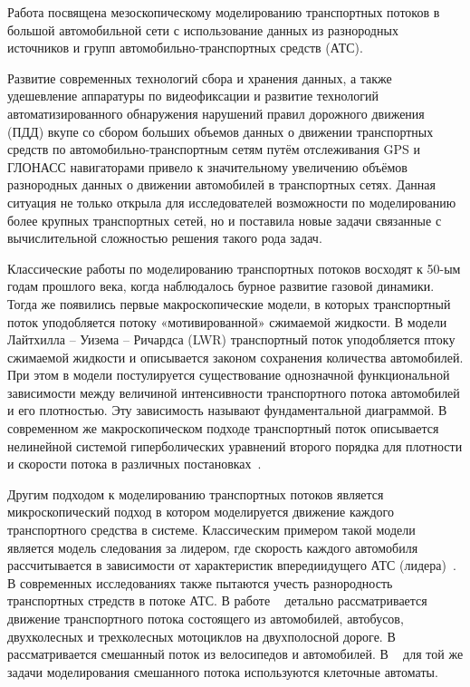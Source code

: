 
Работа посвящена мезоскопическому моделированию транспортных потоков в большой 
автомобильной сети с использование данных из разнородных источников и групп 
автомобильно-транспортных средств (АТС).

{\actuality} Развитие современных технологий сбора и хранения данных, а также
удешевление аппаратуры по видеофиксации и развитие технологий автоматизированного 
обнаружения нарушений правил дорожного движения (ПДД) вкупе со сбором больших объемов 
данных о движении транспортных средств по автомобильно-транспортным сетям путём отслеживания 
GPS и ГЛОНАСС навигаторами привело к значительному увеличению объёмов разнородных данных о 
движении автомобилей в транспортных сетях.
Данная ситуация не только открыла для исследователей возможности по моделированию
более крупных транспортных сетей, но и поставила новые задачи связанные с вычислительной
сложностью решения такого рода задач.

Классические работы по моделированию транспортных потоков восходят к 50-ым годам прошлого века, когда наблюдалось бурное развитие газовой динамики.
Тогда же появились первые макроскопические модели, в которых транспортный поток уподобляется потоку «мотивированной» сжимаемой жидкости.
В модели Лайтхилла – Уизема – Ричардса (LWR)\autocite{LWR/lighthill1955kinematic} транспортный поток уподобляется птоку сжимаемой жидкости и 
описывается законом сохранения количества автомобилей.
При этом в модели постулируется существование однозначной функциональной зависимости между величиной интенсивности транспортного потока автомобилей и его плотностью. 
Эту зависимость называют фундаментальной диаграммой.
В современном же макроскопическом подходе транспортный поток описывается нелинейной системой гиперболических уравнений второго порядка для плотности и скорости потока в различных постановках~\autocite{siebel2006fundamental, collectiveArticle}.

Другим подходом к моделированию транспортных потоков является микроскопический подход в котором моделируется движение каждого транспортного средства в системе.
Классическим примером такой модели является модель следования за лидером, где скорость каждого автомобиля рассчитывается в зависимости от характеристик впередиидущего АТС (лидера)~\autocite{gasn2017introd}.
В современных исследованиях также пытаются учесть разнородность транспортных стредств в потоке АТС.
В работе ~\autocite{dey2008simulation} детально рассматривается движение транспортного потока состоящего из автомобилей, автобусов, двухколесных и трехколесных мотоциклов на двухполосной дороге.
В ~\autocite{guo2011dynamics} рассматривается смешанный поток из велосипедов и автомобилей.
В ~\autocite{gundaliya2008heterogeneous, lan2005inhomogeneous} для той же задачи моделирования смешанного потока используются клеточные автоматы.

